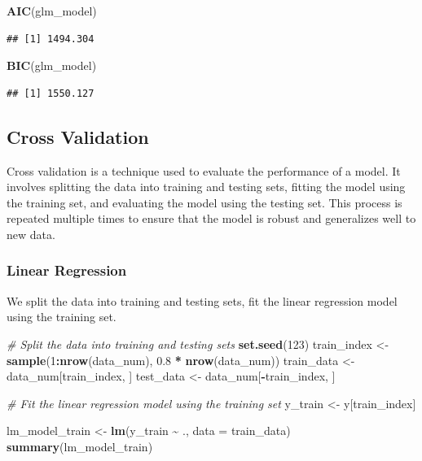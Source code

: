 \documentclass[
]{article}
\newenvironment{Shaded}{\begin{snugshade}}{\end{snugshade}}
\newcommand{\AttributeTok}[1]{\textcolor[rgb]{0.13,0.29,0.53}{#1}}
\newcommand{\CommentTok}[1]{\textcolor[rgb]{0.56,0.35,0.01}{\textit{#1}}}
\newcommand{\DecValTok}[1]{\textcolor[rgb]{0.00,0.00,0.81}{#1}}
\newcommand{\FloatTok}[1]{\textcolor[rgb]{0.00,0.00,0.81}{#1}}
\newcommand{\FunctionTok}[1]{\textcolor[rgb]{0.13,0.29,0.53}{\textbf{#1}}}
\newcommand{\NormalTok}[1]{#1}
\newcommand{\OtherTok}[1]{\textcolor[rgb]{0.56,0.35,0.01}{#1}}
\newcommand{\SpecialCharTok}[1]{\textcolor[rgb]{0.81,0.36,0.00}{\textbf{#1}}}
\begin{document}
\begin{Shaded}
\begin{Highlighting}[]
\FunctionTok{AIC}\NormalTok{(glm\_model)}
\end{Highlighting}
\end{Shaded}

\begin{verbatim}
## [1] 1494.304
\end{verbatim}

\begin{Shaded}
\begin{Highlighting}[]
\FunctionTok{BIC}\NormalTok{(glm\_model)}
\end{Highlighting}
\end{Shaded}

\begin{verbatim}
## [1] 1550.127
\end{verbatim}

\subsection{Cross Validation}\label{cross-validation}

Cross validation is a technique used to evaluate the performance of a
model. It involves splitting the data into training and testing sets,
fitting the model using the training set, and evaluating the model using
the testing set. This process is repeated multiple times to ensure that
the model is robust and generalizes well to new data.

\subsubsection{Linear Regression}\label{linear-regression-1}

We split the data into training and testing sets, fit the linear
regression model using the training set.

\begin{Shaded}
\begin{Highlighting}[]
\CommentTok{\# Split the data into training and testing sets}
\FunctionTok{set.seed}\NormalTok{(}\DecValTok{123}\NormalTok{)}
\NormalTok{train\_index }\OtherTok{\textless{}{-}} \FunctionTok{sample}\NormalTok{(}\DecValTok{1}\SpecialCharTok{:}\FunctionTok{nrow}\NormalTok{(data\_num), }\FloatTok{0.8} \SpecialCharTok{*} \FunctionTok{nrow}\NormalTok{(data\_num))}
\NormalTok{train\_data }\OtherTok{\textless{}{-}}\NormalTok{ data\_num[train\_index, ]}
\NormalTok{test\_data }\OtherTok{\textless{}{-}}\NormalTok{ data\_num[}\SpecialCharTok{{-}}\NormalTok{train\_index, ]}

\CommentTok{\# Fit the linear regression model using the training set}
\NormalTok{y\_train }\OtherTok{\textless{}{-}}\NormalTok{ y[train\_index]}

\NormalTok{lm\_model\_train }\OtherTok{\textless{}{-}} \FunctionTok{lm}\NormalTok{(y\_train }\SpecialCharTok{\textasciitilde{}}\NormalTok{ ., }\AttributeTok{data =}\NormalTok{ train\_data)}
\FunctionTok{summary}\NormalTok{(lm\_model\_train)}
\end{Highlighting}
\end{Shaded}
\end{document}
